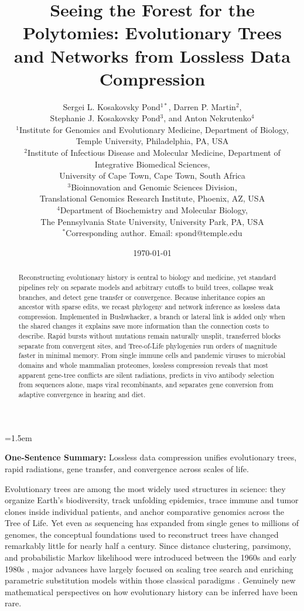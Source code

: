 \documentclass[11pt,a4paper]{article}
\title{\textbf{Seeing the Forest for the Polytomies: Evolutionary Trees and Networks from Lossless Data Compression}}
\author{Sergei L. Kosakovsky Pond$^{1*}$, Darren P. Martin$^{2}$,\\
Stephanie J. Kosakovsky Pond$^{3}$, and Anton Nekrutenko$^{4}$\\[0.5em] %
\small $^{1}$Institute for Genomics and Evolutionary Medicine, Department of Biology,\\
\small Temple University, Philadelphia, PA, USA\\
\small $^{2}$Institute of Infectious Disease and Molecular Medicine, Department of Integrative Biomedical Sciences,\\
\small University of Cape Town, Cape Town, South Africa\\
\small $^{3}$Bioinnovation and Genomic Sciences Division,\\
\small Translational Genomics Research Institute, Phoenix, AZ, USA\\
\small $^{4}$Department of Biochemistry and Molecular Biology,\\
\small The Pennsylvania State University, University Park, PA, USA\\[0.3em]
\small $^{*}$Corresponding author. Email: spond@temple.edu}
\date{\today}
\begin{document}
\sloppy
\emergencystretch=1.5em
\maketitle

\noindent\textbf{One-Sentence Summary:} Lossless data compression unifies evolutionary trees, rapid radiations, gene transfer, and convergence across scales of life.

\bigskip

\begin{abstract}
\noindent Reconstructing evolutionary history is central to biology and medicine, yet standard pipelines rely on separate models and arbitrary cutoffs to build trees, collapse weak branches, and detect gene transfer or convergence. Because inheritance copies an ancestor with sparse edits, we recast phylogeny and network inference as lossless data compression. Implemented in Bushwhacker, a branch or lateral link is added only when the shared changes it explains save more information than the connection costs to describe. Rapid bursts without mutations remain naturally unsplit, transferred blocks separate from convergent sites, and Tree-of-Life phylogenies run orders of magnitude faster in minimal memory. From single immune cells and pandemic viruses to microbial domains and whole mammalian proteomes, lossless compression reveals that most apparent gene-tree conflicts are silent radiations, predicts in vivo antibody selection from sequences alone, maps viral recombinants, and separates gene conversion from adaptive convergence in hearing and diet.
\end{abstract}


\medskip

Evolutionary trees are among the most widely used structures in science: they organize Earth's biodiversity, track unfolding epidemics, trace immune and tumor clones inside individual patients, and anchor comparative genomics across the Tree of Life. Yet even as sequencing has expanded from single genes to millions of genomes, the conceptual foundations used to reconstruct trees have changed remarkably little for nearly half a century. Since distance clustering, parsimony, and probabilistic Markov likelihood were introduced between the 1960s and early 1980s \citep{fitch1971toward,felsenstein1981evolutionary,saitou1987neighbor}, major advances have largely focused on scaling tree search and enriching parametric substitution models within those classical paradigms \citep{price2010fasttree,kozlov2019raxml,minh2020iqtree}. Genuinely new mathematical perspectives on how evolutionary history can be inferred have been rare.
\end{document}
